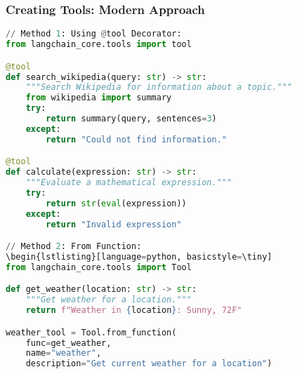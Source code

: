 \begin{frame}[fragile]\frametitle{Creating Tools: Modern Approach}

\begin{lstlisting}[language=python, basicstyle=\tiny]
// Method 1: Using @tool Decorator:
from langchain_core.tools import tool

@tool
def search_wikipedia(query: str) -> str:
    """Search Wikipedia for information about a topic."""
    from wikipedia import summary
    try:
        return summary(query, sentences=3)
    except:
        return "Could not find information."

@tool
def calculate(expression: str) -> str:
    """Evaluate a mathematical expression."""
    try:
        return str(eval(expression))
    except:
        return "Invalid expression"

// Method 2: From Function:
\begin{lstlisting}[language=python, basicstyle=\tiny]
from langchain_core.tools import Tool

def get_weather(location: str) -> str:
    """Get weather for a location."""
    return f"Weather in {location}: Sunny, 72F"

weather_tool = Tool.from_function(
    func=get_weather,
    name="weather",
    description="Get current weather for a location")
\end{lstlisting}

\end{frame}

